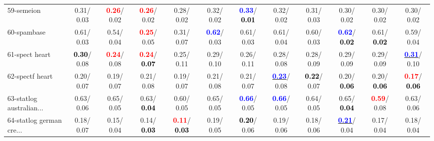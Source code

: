 \begin{table}[h]
\begin{center}
{\begin{tabular}{lc|c|c|c|c|c|c|c|c|c|c}
59-semeion &   0.31/  0.03 & \textcolor{red}{\textbf{  0.26}}/  0.02 & \textcolor{red}{\textbf{  0.26}}/  0.02 &   0.28/  0.02 &   0.32/  0.02 & \textcolor{blue}{\textbf{  0.33}}/\textcolor{black}{\textbf{  0.01}} &   0.32/  0.02 &   0.31/  0.03 &   0.30/  0.02 &   0.30/  0.02 &   0.30/  0.02 \\
60-spambase &   0.61/  0.03 &   0.54/  0.04 & \textcolor{red}{\textbf{  0.25}}/  0.05 &   0.31/  0.07 & \textcolor{blue}{\textbf{  0.62}}/  0.03 &   0.61/  0.03 &   0.61/  0.04 &   0.60/  0.03 & \textcolor{blue}{\textbf{  0.62}}/\textcolor{black}{\textbf{  0.02}} &   0.61/\textcolor{black}{\textbf{  0.02}} &   0.59/  0.04 \\ \hline
61-spect heart & \textcolor{black}{\textbf{  0.30}}/  0.08 & \textcolor{red}{\textbf{  0.24}}/  0.08 & \textcolor{red}{\textbf{  0.24}}/\textcolor{black}{\textbf{  0.07}} &   0.25/  0.11 &   0.29/  0.10 &   0.26/  0.11 &   0.28/  0.08 &   0.28/  0.09 &   0.29/  0.09 &   0.29/  0.09 & \underline{\textcolor{blue}{\textbf{  0.31}}}/  0.10 \\
62-spectf heart &   0.20/  0.07 &   0.19/  0.07 &   0.21/  0.08 &   0.19/  0.07 &   0.21/  0.08 &   0.21/  0.07 & \underline{\textcolor{blue}{\textbf{  0.23}}}/  0.08 & \textcolor{black}{\textbf{  0.22}}/  0.07 &   0.20/\textcolor{black}{\textbf{  0.06}} &   0.20/\textcolor{black}{\textbf{  0.06}} & \textcolor{red}{\textbf{  0.17}}/\textcolor{black}{\textbf{  0.06}} \\
63-statlog australian... &   0.63/  0.06 &   0.65/  0.05 &   0.63/\textcolor{black}{\textbf{  0.04}} &   0.60/  0.05 &   0.65/  0.05 & \textcolor{blue}{\textbf{  0.66}}/  0.05 & \textcolor{blue}{\textbf{  0.66}}/  0.05 &   0.64/  0.05 &   0.65/\textcolor{black}{\textbf{  0.04}} & \textcolor{red}{\textbf{  0.59}}/  0.08 &   0.63/  0.06 \\
64-statlog german cre... &   0.18/  0.07 &   0.15/  0.04 &   0.14/\textcolor{black}{\textbf{  0.03}} & \textcolor{red}{\textbf{  0.11}}/\textcolor{black}{\textbf{  0.03}} &   0.19/  0.05 & \textcolor{black}{\textbf{  0.20}}/  0.06 &   0.19/  0.06 &   0.18/  0.06 & \underline{\textcolor{blue}{\textbf{  0.21}}}/  0.04 &   0.17/  0.04 &   0.18/  0.04 \\\end{tabular}
}\label{strats1bC4.5w}
\end{center}
\end{table}
